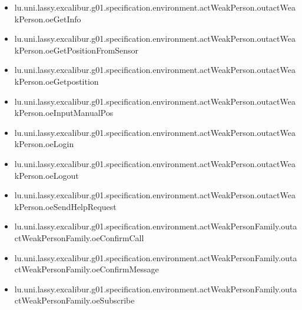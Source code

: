 \begin{itemize}
\item lu.uni.lassy.excalibur.g01.specification.environment.actWeakPerson.outactWeakPerson.oeGetInfo 
\item lu.uni.lassy.excalibur.g01.specification.environment.actWeakPerson.outactWeakPerson.oeGetPositionFromSensor 
\item lu.uni.lassy.excalibur.g01.specification.environment.actWeakPerson.outactWeakPerson.oeGetpostition 
\item lu.uni.lassy.excalibur.g01.specification.environment.actWeakPerson.outactWeakPerson.oeInputManualPos 
\item lu.uni.lassy.excalibur.g01.specification.environment.actWeakPerson.outactWeakPerson.oeLogin 
\item lu.uni.lassy.excalibur.g01.specification.environment.actWeakPerson.outactWeakPerson.oeLogout 
\item lu.uni.lassy.excalibur.g01.specification.environment.actWeakPerson.outactWeakPerson.oeSendHelpRequest 
\item lu.uni.lassy.excalibur.g01.specification.environment.actWeakPersonFamily.outactWeakPersonFamily.oeConfirmCall 
\item lu.uni.lassy.excalibur.g01.specification.environment.actWeakPersonFamily.outactWeakPersonFamily.oeConfirmMessage 
\item lu.uni.lassy.excalibur.g01.specification.environment.actWeakPersonFamily.outactWeakPersonFamily.oeSubscribe 
\end{itemize}








